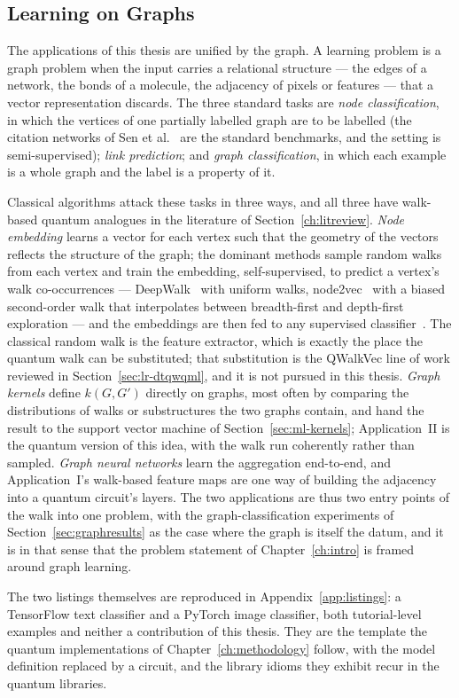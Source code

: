 \subsection{Learning on Graphs}
\label{sec:ml-graphs}
The applications of this thesis are unified by the graph. A learning problem
is a graph problem when the input carries a relational structure --- the
edges of a network, the bonds of a molecule, the adjacency of pixels or
features --- that a vector representation discards. The three standard tasks
are \emph{node classification}, in which the vertices of one partially
labelled graph are to be labelled (the citation networks of Sen et
al.~\cite{Sen_2008} are the standard benchmarks, and the setting is
semi-supervised); \emph{link prediction}; and \emph{graph classification},
in which each example is a whole graph and the label is a property of it.

Classical algorithms attack these tasks in three ways, and all three have
walk-based quantum analogues in the literature of
Section~\ref{ch:litreview}. \emph{Node embedding} learns a vector for each
vertex such that the geometry of the vectors reflects the structure of the
graph; the dominant methods sample random walks from each vertex and train
the embedding, self-supervised, to predict a vertex's walk co-occurrences ---
DeepWalk~\cite{Perozzi_2014} with uniform walks, node2vec~\cite{Grover_2016}
with a biased second-order walk that interpolates between breadth-first and
depth-first exploration --- and the embeddings are then fed to any
supervised classifier~\cite{Xia_2020, doi:10.1137/20M1386062, Bozorgi_2024}.
The classical random walk is the feature extractor, which is exactly the
place the quantum walk can be substituted; that substitution is the
QWalkVec line of work reviewed in Section~\ref{sec:lr-dtqwqml}, and it is not
pursued in this thesis. \emph{Graph kernels} define $k(G, G')$ directly on graphs, most
often by comparing the distributions of walks or substructures the two
graphs contain, and hand the result to the support vector machine of
Section~\ref{sec:ml-kernels}; Application~II is the quantum version of this
idea, with the walk run coherently rather than sampled. \emph{Graph neural
networks} learn the aggregation end-to-end, and Application~I's walk-based
feature maps are one way of building the adjacency into a quantum
circuit's layers. The two applications are thus two entry points of the
walk into one problem, with the graph-classification experiments of
Section~\ref{sec:graphresults} as the case where the graph is itself the
datum, and it is in that sense that the problem statement of
Chapter~\ref{ch:intro} is framed around graph learning.

The two listings themselves are reproduced in Appendix~\ref{app:listings}:
a TensorFlow text classifier and a PyTorch image classifier, both
tutorial-level examples and neither a contribution of this thesis. They are
the template the quantum implementations of
Chapter~\ref{ch:methodology} follow, with the model definition replaced by a
circuit, and the library idioms they exhibit recur in the quantum libraries.


